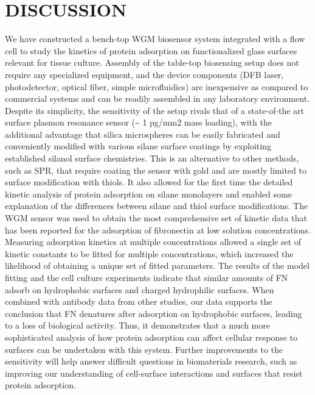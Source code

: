 
\chapter{DISCUSSION}

We have constructed a bench-top WGM biosensor system integrated with
a flow cell to study the kinetics of protein adsorption on functionalized
glass surfaces relevant for tissue culture. Assembly of the table-top
biosensing setup does not require any specialized equipment, and the
device components (DFB laser, photodetector, optical fiber, simple
microfluidics) are inexpensive as compared to commercial systems and
can be readily assembled in any laboratory environment. Despite its
simplicity, the sensitivity of the setup rivals that of a state-of-the
art surface plasmon resonance sensor (\textasciitilde{} 1 pg/mm2 mass
loading), with the additional advantage that silica microspheres can
be easily fabricated and conveniently modified with various silane
surface coatings by exploiting established silanol surface chemistries.
This is an alternative to other methods, such as SPR, that require
coating the sensor with gold and are mostly limited to surface modification
with thiols. It also allowed for the first time the detailed kinetic
analysis of protein adsorption on silane monolayers and enabled some
explanation of the differences between silane and thiol surface modifications.
The WGM sensor was used to obtain the most comprehensive set of kinetic
data that has been reported for the adsorption of fibronectin at low
solution concentrations. Measuring adsorption kinetics at multiple
concentrations allowed a single set of kinetic constants to be fitted
for multiple concentrations, which increased the likelihood of obtaining
a unique set of fitted parameters. The results of the model fitting
and the cell culture experiments indicate that similar amounts of
FN adsorb on hydrophobic surfaces and charged hydrophilic surfaces.
When combined with antibody data from other studies, our data supports
the conclusion that FN denatures after adsorption on hydrophobic surfaces,
leading to a loss of biological activity. Thus, it demonstrates that
a much more sophisticated analysis of how protein adsorption can affect
cellular response to surfaces can be undertaken with this system.
Further improvements to the sensitivity will help answer difficult
questions in biomaterials research, such as improving our understanding
of cell-surface interactions and surfaces that resist protein adsorption.

